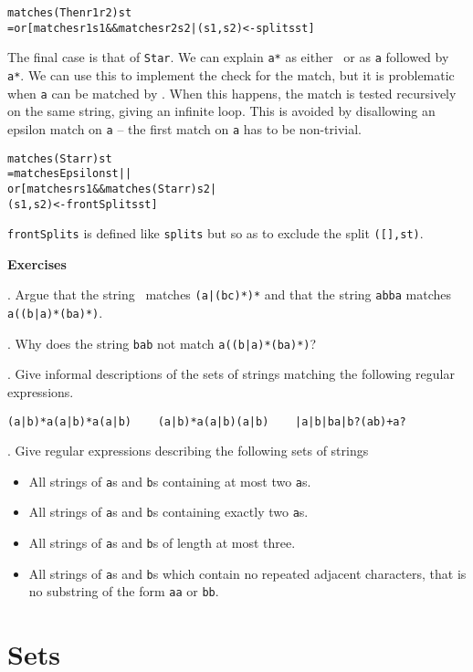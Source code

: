 \documentclass[11pt]{article}
\begin{document}
\begin{alltt}
matches (Then r1 r2) st
  = or [matches r1 s1 \&\& matches r2 s2 | (s1,s2)<-splits st]
\end{alltt}
The final case is that of {\tt Star}. We can explain {\tt a*} as either
\eps\ or as {\tt a} followed by {\tt a*}. We can use this to implement the
check for the match, but it is problematic when {\tt a} can be
matched by \eps. When this happens, the match is tested recursively on the
same string, giving an infinite loop. This is avoided by disallowing an
epsilon match on {\tt a} -- the first match on {\tt a} has to be non-trivial.

\begin{alltt}
matches (Star r) st
  = matches Epsilon st ||
      or [ matches r s1 \&\& matches (Star r) s2 |
                     (s1,s2) <- frontSplits st ]
\end{alltt}
{\tt frontSplits} is defined like {\tt splits} but
so as to exclude the split {\tt ([],st)}.

\medskip
\noindent
{\bf Exercises}

\medskip
{}. Argue that the string \eps\ matches {\tt (a|(bc)*)*} and that the string
{\tt abba}
matches {\tt a((b|a)*(ba)*)}.

\medskip
{}. Why does the string {\tt bab} not match {\tt a((b|a)*(ba)*)}?

\medskip
{}. Give informal descriptions of the sets of strings matching the following
regular expressions.
\begin{center}
{\tt (a|b)*a(a|b)*a(a|b)\ \ \ \ (a|b)*a(a|b)(a|b)\ \ \ \ \eps|a|b|ba|b?(ab)+a?}
\end{center}

\medskip
{}. Give regular expressions describing the following sets of strings
\begin{itemize}
\item All strings of {\tt a}s and {\tt b}s containing at most two {\tt a}s.
\item All strings of {\tt a}s and {\tt b}s containing exactly two {\tt a}s.
\item All strings of {\tt a}s and {\tt b}s of length at most three.
\item All strings of {\tt a}s and {\tt b}s which contain no repeated adjacent
characters, that is no substring of the form {\tt a{}a} or {\tt b{}b}.
\end{itemize}

\section{Sets}
\end{document}
